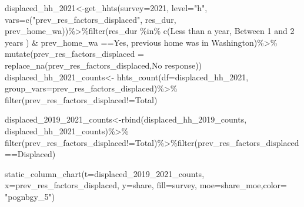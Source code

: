 \documentclass[
]{article}
\newenvironment{Shaded}{\begin{snugshade}}{\end{snugshade}}
\newcommand{\AttributeTok}[1]{\textcolor[rgb]{0.77,0.63,0.00}{#1}}
\newcommand{\FunctionTok}[1]{\textcolor[rgb]{0.00,0.00,0.00}{#1}}
\newcommand{\NormalTok}[1]{#1}
\newcommand{\OtherTok}[1]{\textcolor[rgb]{0.56,0.35,0.01}{#1}}
\newcommand{\SpecialCharTok}[1]{\textcolor[rgb]{0.00,0.00,0.00}{#1}}
\newcommand{\StringTok}[1]{\textcolor[rgb]{0.31,0.60,0.02}{#1}}
\begin{document}
\begin{Shaded}
\begin{Highlighting}[]
\NormalTok{displaced\_hh\_2021}\OtherTok{\textless{}{-}}\FunctionTok{get\_hhts}\NormalTok{(}\AttributeTok{survey=}\StringTok{\textquotesingle{}2021\textquotesingle{}}\NormalTok{, }\AttributeTok{level=}\StringTok{"h"}\NormalTok{, }\AttributeTok{vars=}\FunctionTok{c}\NormalTok{(}\StringTok{"prev\_res\_factors\_displaced"}\NormalTok{, }\StringTok{\textquotesingle{}res\_dur\textquotesingle{}}\NormalTok{, }\StringTok{\textquotesingle{}prev\_home\_wa\textquotesingle{}}\NormalTok{))}\SpecialCharTok{\%\textgreater{}\%}\FunctionTok{filter}\NormalTok{(res\_dur }\SpecialCharTok{\%in\%} \FunctionTok{c}\NormalTok{(}\StringTok{\textquotesingle{}Less than a year\textquotesingle{}}\NormalTok{, }\StringTok{\textquotesingle{}    Between 1 and 2 years\textquotesingle{}}\NormalTok{ ) }\SpecialCharTok{\&}\NormalTok{ prev\_home\_wa }\SpecialCharTok{==}\StringTok{\textquotesingle{}Yes, previous home was in Washington\textquotesingle{}}\NormalTok{)}\SpecialCharTok{\%\textgreater{}\%} \FunctionTok{mutate}\NormalTok{(}\AttributeTok{prev\_res\_factors\_displaced =} \FunctionTok{replace\_na}\NormalTok{(prev\_res\_factors\_displaced,}\StringTok{\textquotesingle{}No response\textquotesingle{}}\NormalTok{))}
\NormalTok{displaced\_hh\_2021\_counts}\OtherTok{\textless{}{-}} \FunctionTok{hhts\_count}\NormalTok{(}\AttributeTok{df=}\NormalTok{displaced\_hh\_2021, }\AttributeTok{group\_vars=}\StringTok{\textquotesingle{}prev\_res\_factors\_displaced\textquotesingle{}}\NormalTok{)}\SpecialCharTok{\%\textgreater{}\%}
\FunctionTok{filter}\NormalTok{(prev\_res\_factors\_displaced}\SpecialCharTok{!=}\StringTok{\textquotesingle{}Total\textquotesingle{}}\NormalTok{)}

\NormalTok{displaced\_2019\_2021\_counts}\OtherTok{\textless{}{-}}\FunctionTok{rbind}\NormalTok{(displaced\_hh\_2019\_counts, displaced\_hh\_2021\_counts)}\SpecialCharTok{\%\textgreater{}\%}
\FunctionTok{filter}\NormalTok{(prev\_res\_factors\_displaced}\SpecialCharTok{!=}\StringTok{\textquotesingle{}Total\textquotesingle{}}\NormalTok{)}\SpecialCharTok{\%\textgreater{}\%}\FunctionTok{filter}\NormalTok{(prev\_res\_factors\_displaced}\SpecialCharTok{==}\StringTok{\textquotesingle{}Displaced\textquotesingle{}}\NormalTok{)}

\FunctionTok{static\_column\_chart}\NormalTok{(}\AttributeTok{t=}\NormalTok{displaced\_2019\_2021\_counts, }\AttributeTok{x=}\StringTok{\textquotesingle{}prev\_res\_factors\_displaced\textquotesingle{}}\NormalTok{, }\AttributeTok{y=}\StringTok{\textquotesingle{}share\textquotesingle{}}\NormalTok{, }\AttributeTok{fill=}\StringTok{\textquotesingle{}survey\textquotesingle{}}\NormalTok{, }\AttributeTok{moe=}\StringTok{\textquotesingle{}share\_moe\textquotesingle{}}\NormalTok{,}\AttributeTok{color=}  \StringTok{"pognbgy\_5"}\NormalTok{)}
\end{Highlighting}
\end{Shaded}
\end{document}
